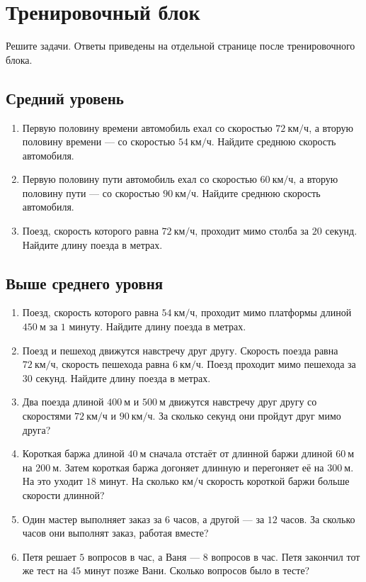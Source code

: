 \documentclass[a4paper,12pt]{article}
\newcommand{\kmh}{\text{км/ч}}
\newcommand{\m}{\text{м}}
\begin{document}
\newpage

\section{Тренировочный блок}

Решите задачи. Ответы приведены на отдельной странице после тренировочного блока.

\subsection*{Средний уровень}

\begin{enumerate}
    \item Первую половину времени автомобиль ехал со скоростью $72\ \kmh$, а вторую половину времени --- со скоростью $54\ \kmh$. Найдите среднюю скорость автомобиля.

    \item Первую половину пути автомобиль ехал со скоростью $60\ \kmh$, а вторую половину пути --- со скоростью $90\ \kmh$. Найдите среднюю скорость автомобиля.

    \item Поезд, скорость которого равна $72\ \kmh$, проходит мимо столба за $20$ секунд. Найдите длину поезда в метрах.
\end{enumerate}

\subsection*{Выше среднего уровня}

\begin{enumerate}[resume]
    \item Поезд, скорость которого равна $54\ \kmh$, проходит мимо платформы длиной $450\ \m$ за $1$ минуту. Найдите длину поезда в метрах.

    \item Поезд и пешеход движутся навстречу друг другу. Скорость поезда равна $72\ \kmh$, скорость пешехода равна $6\ \kmh$. Поезд проходит мимо пешехода за $30$ секунд. Найдите длину поезда в метрах.

    \item Два поезда длиной $400\ \m$ и $500\ \m$ движутся навстречу друг другу со скоростями $72\ \kmh$ и $90\ \kmh$. За сколько секунд они пройдут друг мимо друга?

    \item Короткая баржа длиной $40\ \m$ сначала отстаёт от длинной баржи длиной $60\ \m$ на $200\ \m$. Затем короткая баржа догоняет длинную и перегоняет её на $300\ \m$. На это уходит $18$ минут. На сколько $\kmh$ скорость короткой баржи больше скорости длинной?

    \item Один мастер выполняет заказ за $6$ часов, а другой --- за $12$ часов. За сколько часов они выполнят заказ, работая вместе?

    \item Петя решает $5$ вопросов в час, а Ваня --- $8$ вопросов в час. Петя закончил тот же тест на $45$ минут позже Вани. Сколько вопросов было в тесте?
\end{enumerate}
\end{document}
